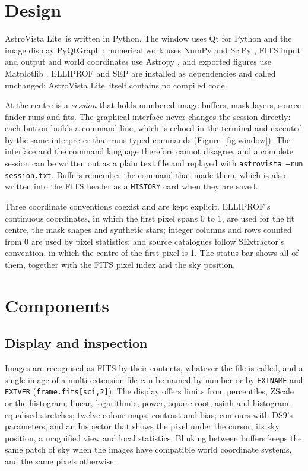 \documentclass[twocolumn]{aastex701}
\newcommand{\avl}{AstroVista Lite}
\newcommand{\code}[1]{\texttt{#1}}
\begin{document}
\section{Design} \label{sec:design}

\avl\ is written in Python. The window uses Qt for Python \citep{pyside6} and the image
display PyQtGraph \citep{pyqtgraph}; numerical work uses NumPy \citep{Harris2020} and
SciPy \citep{Virtanen2020}, FITS input and output and world coordinates use Astropy
\citep{Astropy2013,Astropy2018,Astropy2022}, and exported figures use Matplotlib
\citep{Hunter2007}. ELLIPROF and SEP are installed as dependencies and called unchanged;
\avl\ itself contains no compiled code.

At the centre is a \emph{session} that holds numbered image buffers, mask layers,
source-finder runs and fits. The graphical interface never changes the session directly:
each button builds a command line, which is echoed in the terminal and executed by the same
interpreter that runs typed commands (Figure~\ref{fig:window}). The interface and the
command language therefore cannot disagree, and a complete session can be written out as a
plain text file and replayed with \code{astrovista --run session.txt}. Buffers remember the
command that made them, which is also written into the FITS header as a \code{HISTORY}
card when they are saved.

Three coordinate conventions coexist and are kept explicit. ELLIPROF's continuous
coordinates, in which the first pixel spans 0 to 1, are used for the fit centre, the mask
shapes and synthetic stars; integer columns and rows counted from 0 are used by pixel
statistics; and source catalogues follow SExtractor's convention, in which the centre of
the first pixel is 1. The status bar shows all of them, together with the FITS pixel index
and the sky position.

\section{Components} \label{sec:components}

\subsection{Display and inspection}

Images are recognised as FITS by their contents, whatever the file is called, and a single
image of a multi-extension file can be named by number or by \code{EXTNAME} and
\code{EXTVER} (\code{frame.fits[sci,2]}). The display offers limits from percentiles,
ZScale or the histogram; linear, logarithmic, power, square-root, asinh and
histogram-equalised stretches; twelve colour maps; contrast and bias; contours with DS9's
parameters; and an Inspector that shows the pixel under the cursor, its sky position, a
magnified view and local statistics. Blinking between buffers keeps the same patch of sky
when the images have compatible world coordinate systems, and the same pixels otherwise.
\end{document}
